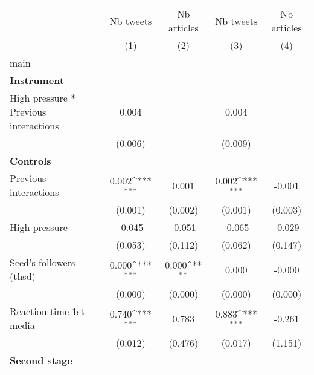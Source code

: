 {
\def\sym#1{\ifmmode^{#1}\else\(^{#1}\)\fi}
\begin{tabular}{l*{4}{c}}
\hline\hline
                    &\multicolumn{1}{c}{Nb tweets}&\multicolumn{1}{c}{Nb articles}&\multicolumn{1}{c}{Nb tweets}&\multicolumn{1}{c}{Nb articles}\\\cmidrule(lr){2-2}\cmidrule(lr){3-3}\cmidrule(lr){4-4}\cmidrule(lr){5-5}
                    &\multicolumn{1}{c}{(1)}         &\multicolumn{1}{c}{(2)}         &\multicolumn{1}{c}{(3)}         &\multicolumn{1}{c}{(4)}         \\
\hline
main                &                     &                     &                     &                     \\
\textbf{Instrument} &                     &                     &                     &                     \\
High pressure * Previous interactions&       0.004         &                     &       0.004         &                     \\
                    &     (0.006)         &                     &     (0.009)         &                     \\
\textbf{Controls}   &                     &                     &                     &                     \\
Previous interactions&       0.002\sym{***}&       0.001         &       0.002\sym{***}&      -0.001         \\
                    &     (0.001)         &     (0.002)         &     (0.001)         &     (0.003)         \\
High pressure       &      -0.045         &      -0.051         &      -0.065         &      -0.029         \\
                    &     (0.053)         &     (0.112)         &     (0.062)         &     (0.147)         \\
Seed's followers (thsd)&       0.000\sym{***}&       0.000\sym{**} &       0.000         &      -0.000         \\
                    &     (0.000)         &     (0.000)         &     (0.000)         &     (0.000)         \\
Reaction time 1st media&       0.740\sym{***}&       0.783         &       0.883\sym{***}&      -0.261         \\
                    &     (0.012)         &     (0.476)         &     (0.017)         &     (1.151)         \\
\textbf{Second stage}&                     &                     &                     &                     \\

\end{tabular}}

